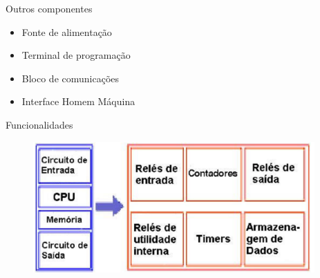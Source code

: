 \documentclass[aspectratio=169,
				xcolor=table]{beamer}
\begin{document}
	\begin{frame}{Outros componentes}
		\begin{itemize}
			\item Fonte de alimentação
			\vspace{1em}
			\item Terminal de programação
			\vspace{1em}
			\item Bloco de comunicações
			\vspace{1em}
			\item Interface Homem Máquina

		\end{itemize}
	\end{frame}
	
	\begin{frame}{Funcionalidades}
				\begin{figure}[hbtp]
				\centering
				\includegraphics[height=5cm, keepaspectratio]{../figs/cap04/funcionalidades.png}
				\end{figure}
	\end{frame}
	
\end{document}
